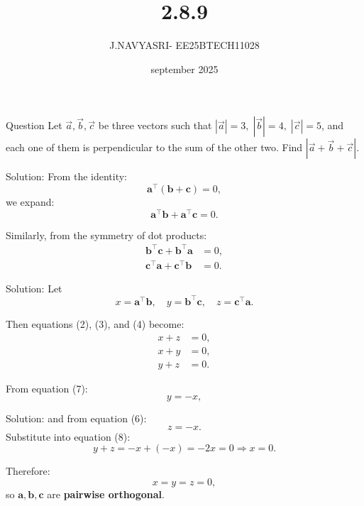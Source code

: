 \documentclass{beamer}
\title %
{2.8.9}
\date{september 2025}
\author %
{J.NAVYASRI- EE25BTECH11028}
\begin{document}
\frame{\titlepage}
\begin{frame}{Question}
Let $\vec{a}, \vec{b}, \vec{c}$ be three vectors such that 
$|\vec{a}|=3,\; |\vec{b}|=4,\; |\vec{c}|=5$, and each one of them is perpendicular to the sum of the other two. 
Find $|\vec{a}+\vec{b}+\vec{c}|$.
\end{frame}


\begin{frame}{Solution:}
From the identity:
\begin{equation} \label{eq1}
\mathbf{a}^\top(\mathbf{b} + \mathbf{c}) = 0,
\end{equation}
we expand:
\begin{equation} \label{eq2}
\mathbf{a}^\top \mathbf{b} + \mathbf{a}^\top \mathbf{c} = 0.
\end{equation}

Similarly, from the symmetry of dot products:
\begin{align}
\mathbf{b}^\top \mathbf{c} + \mathbf{b}^\top \mathbf{a} &= 0, \label{eq3} \\
\mathbf{c}^\top \mathbf{a} + \mathbf{c}^\top \mathbf{b} &= 0. \label{eq4}
\end{align}
\end{frame}

\begin{frame}{Solution:}
Let
\begin{equation} \label{eq5}
x = \mathbf{a}^\top \mathbf{b}, \quad y = \mathbf{b}^\top \mathbf{c}, \quad z = \mathbf{c}^\top \mathbf{a}.
\end{equation}

Then equations (2), (3), and (4) become:
\begin{align}
x + z &= 0, \label{eq6} \\
x + y &= 0, \label{eq7} \\
y + z &= 0. \label{eq8}
\end{align}

From equation (7):
\[
y = -x,
\]
\end{frame}

\begin{frame}{Solution:}
and from equation (6):
\[
z = -x.
\]
Substitute into equation (8):
\[
y + z = -x + (-x) = -2x = 0 \Rightarrow x = 0.
\]

Therefore:
\begin{equation} \label{eq9}
x = y = z = 0,
\end{equation}
so $\mathbf{a}, \mathbf{b}, \mathbf{c}$ are \textbf{pairwise orthogonal}.
\end{frame}
\end{document}
